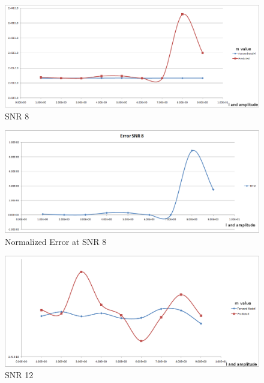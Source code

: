 \begin{figure}
\begin{center}
\includegraphics[scale=0.5]{images/chapter_5/forward/forward_snr_8.png}
\caption{SNR 8}
\end{center}
\end{figure}


\begin{figure}
\begin{center}
\includegraphics[scale=0.5]{images/chapter_5/forward/error_snr_8.png}
\caption{Normalized Error at SNR 8}
\end{center}
\end{figure}


\begin{figure}
\begin{center}
\includegraphics[scale=0.5]{images/chapter_5/forward/forward_snr_12.png}
\caption{SNR 12}
\end{center}
\end{figure}

